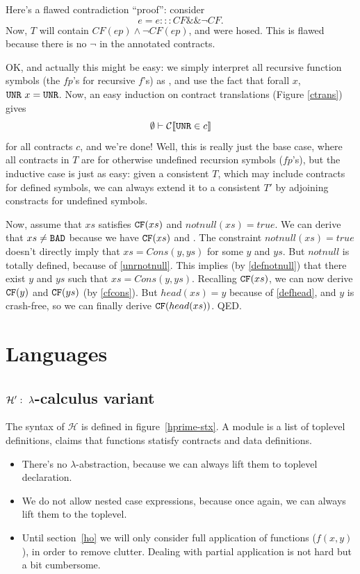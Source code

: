 \documentclass[preprint]{sigplanconf}
\begin{document}
{  Here's a flawed contradiction ``proof'': consider
  \[
  e = e ::: CF \&\& \neg CF.
  \]
  Now, $T$ will contain $CF(ep) \land \neg CF(ep)$, and were hosed.
  This is flawed because there is no $\neg$ in the annotated
  contracts.

  OK, and actually this might be easy: we simply interpret all
  recursive function symbols (the $fp$'s for recursive $f$'s) as
  \unr{}, and use the fact that forall $x$, $\texttt{UNR}{}~x = \texttt{UNR}$.  Now,
  an easy induction on contract translations (Figure \ref{ctrans})
  gives \[ \emptyset \vdash \mathcal{C} \llbracket \texttt{UNR} \in c \rrbracket
  \]
  for all contracts $c$, and we're done!  Well, this is really just
  the base case, where all contracts in $T$ are for otherwise
  undefined recursion symbols ($fp$'s), but the inductive case is just
  as easy: given a consistent $T$, which may include contracts for
  defined symbols, we can always extend it to a consistent $T'$ by
  adjoining constracts for undefined symbols.

}

Now, assume that $xs$ satisfies
$\texttt{CF}(xs)$ and $notnull(xs) = true$.  We can derive that $xs \neq \texttt{BAD}$
because we have $\texttt{CF}(xs)$ and . The constraint
$notnull(xs) = true$ doesn't directly imply that $xs = Cons(y,ys)$ for
some $y$ and $ys$. But $notnull$ is totally defined, because of
\eqref{unrnotnull}. This implies (by \eqref{defnotnull}) that there exist
$y$ and $ys$ such that $xs = Cons(y,ys)$. Recalling $\texttt{CF}(xs)$, we can
now derive $\texttt{CF}(y)$ and $\texttt{CF}(ys)$ (by \eqref{cfcons}). But $head(xs) =
y$ because of \eqref{defhead}, and $y$ is crash-free, so we can finally
derive $\texttt{CF}(head(xs))$. QED.


\section{Languages}
\subsection{$\mathcal{H}':~\lambda$-calculus variant}

The syntax of $\mathcal{H}$ is defined in figure~\ref{hprime-stx}. A module
is a list of toplevel definitions, claims that functions statisfy
contracts and data definitions.

\begin{itemize}
\item There's no $\lambda$-abstraction, because we can always lift
  them to toplevel declaration.
\item We do not allow nested case expressions, because once again, we
  can always lift them to the toplevel.
\item Until section~\ref{ho} we will only consider full application of
  functions ($f(x,y)$), in order to remove clutter. Dealing with
  partial application is not hard but a bit cumbersome.
\end{itemize}
\end{document}
